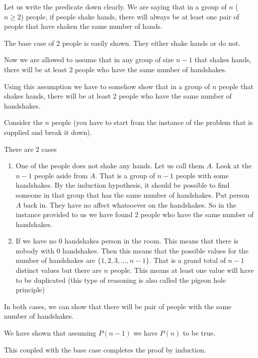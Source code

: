 \documentclass[12pt]{article}
\begin{document}
\begin{Answer}
Let us write the predicate down clearly. We are saying that in a group of $n$ ($n \ge 2$) people, if people shake hands, there will always be at least one pair of people that have shaken the same number of hands.

The base case of 2 people is easily shown. They either shake hands or do not. 

Now we are allowed to assume that in any group of size $n-1$ that shakes hands, there will be at least 2 people who have the same number of handshakes.

Using this assumption we have to somehow show that in a group of $n$ people that shakes hands, there will be at least 2 people who have the same number of handshakes. 

Consider the $n$ people (you have to start from the instance of the problem that is supplied and break it down).

There are 2 cases 

\begin{enumerate}
\item One of the people does not shake any hands. Let us call them $A$. Look at the $n-1$ people aside from $A$. That is a group of $n-1$ people with some handshakes. By the induction hypothesis, it should be possible to find someone in that group that has the same number of handshakes. Put person $A$ back in. They have no affect whatsoever on the handshakes. So in the instance provided to us we have found 2 people who have the same number of handshakes.

\item If we have no 0 handshakes person in the room. This means that there is nobody with 0 handshakes. Then this means that the possible values for the number of handshakes are $\{1,2,3,\ldots, n-1\}$. That is a grand total of $n-1$ distinct values but there are $n$ people. This means at least one value will have to be duplicated (this type of reasoning is also called the pigeon hole principle)

\end{enumerate}

\end{Answer}

In both cases, we can show that there will be pair of people with the same number of handshakes. 

We have shown that assuming $P(n-1)$ we have $P(n)$ to be true.

This coupled with the base case completes the proof by induction.
\end{document}
